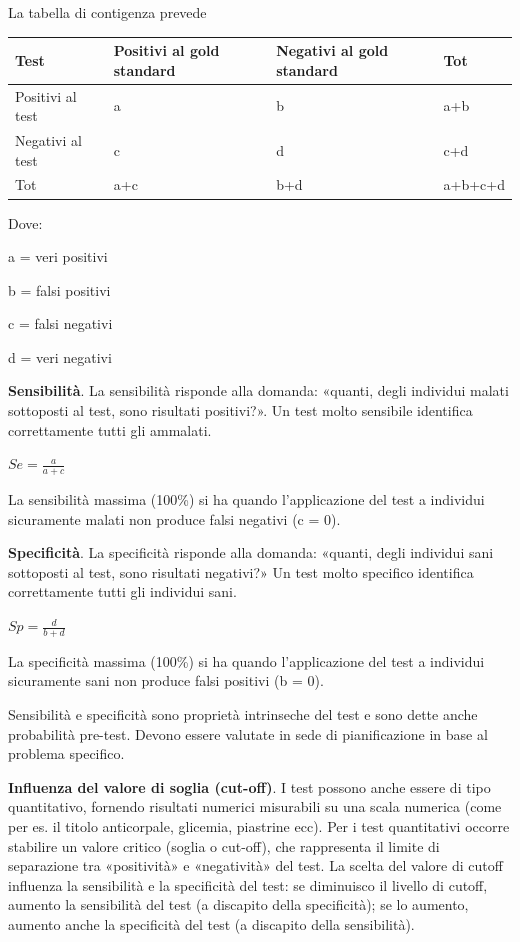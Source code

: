 \documentclass[]{book}
\begin{document}
La tabella di contigenza prevede

\begin{longtable}[]{@{}llll@{}}
\toprule
Test & Positivi al gold standard & Negativi al gold standard & Tot\tabularnewline
\midrule
\endhead
Positivi al test & a & b & a+b\tabularnewline
Negativi al test & c & d & c+d\tabularnewline
Tot & a+c & b+d & a+b+c+d\tabularnewline
\bottomrule
\end{longtable}

Dove:

a = veri positivi

b = falsi positivi

c = falsi negativi

d = veri negativi

\textbf{Sensibilità}. La sensibilità risponde alla domanda: «quanti, degli individui malati sottoposti al test, sono risultati positivi?». Un test molto sensibile identifica correttamente tutti gli ammalati.

\(Se = \frac{a}{a+c}\)

La sensibilità massima (100\%) si ha quando l'applicazione del test a individui sicuramente malati non produce falsi negativi (c = 0).

\textbf{Specificità}. La specificità risponde alla domanda: «quanti, degli individui sani sottoposti al test, sono risultati negativi?» Un test molto specifico identifica correttamente tutti gli individui sani.

\(Sp = \frac{d}{b+d}\)

La specificità massima (100\%) si ha quando l'applicazione del test a individui sicuramente sani non produce falsi positivi (b = 0).

Sensibilità e specificità sono proprietà intrinseche del test e sono dette anche probabilità pre-test. Devono essere valutate in sede di pianificazione in base al problema specifico.

\textbf{Influenza del valore di soglia (cut-off)}. I test possono anche essere di tipo quantitativo, fornendo risultati numerici misurabili su una scala numerica (come per es. il titolo anticorpale, glicemia, piastrine ecc). Per i test quantitativi occorre stabilire un valore critico (soglia o cut-off), che rappresenta il limite di separazione tra «positività» e «negatività» del test.
La scelta del valore di cutoff influenza la sensibilità e la specificità del test: se diminuisco il livello di cutoff, aumento la sensibilità del test (a discapito della specificità); se lo aumento, aumento anche la specificità del test (a discapito della sensibilità).
\end{document}
